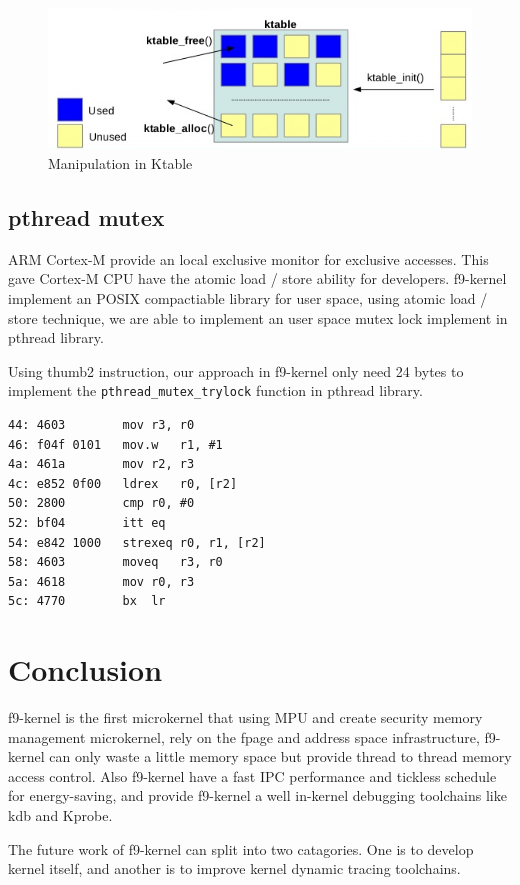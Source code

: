 \documentclass[10pt,preprint,nocopyrightspace]{sigplanconf}
\begin{document}
\begin{figure}[H]
	\begin{center}
		\includegraphics[width=\linewidth]{picture/ktable.png}
	\end{center}
	\caption{Manipulation in Ktable\cite{ncku2015}}
\end{figure}

\subsection{pthread mutex}
ARM Cortex-M provide an local exclusive monitor for exclusive accesses. This gave Cortex-M CPU have the atomic load / store ability for developers\cite{arm2012v7}. f9-kernel implement an POSIX compactiable library for user space, using atomic load / store technique, we are able to implement an user space mutex lock implement in pthread library.

Using thumb2 instruction, our approach in f9-kernel only need 24 bytes to implement the \texttt{pthread\_mutex\_trylock} function in pthread library.

\begin{lstlisting}[basicstyle=\small,frame=single]
44:	4603      	mov	r3, r0
46:	f04f 0101 	mov.w	r1, #1
4a:	461a      	mov	r2, r3
4c:	e852 0f00 	ldrex	r0, [r2]
50:	2800      	cmp	r0, #0
52:	bf04      	itt	eq
54:	e842 1000 	strexeq	r0, r1, [r2]
58:	4603      	moveq	r3, r0
5a:	4618      	mov	r0, r3
5c:	4770      	bx	lr
\end{lstlisting}

\section{Conclusion}
f9-kernel is the first microkernel that using MPU and create security memory management microkernel, rely on the fpage and address space infrastructure, f9-kernel can only waste a little memory space but provide thread to thread memory access control. Also f9-kernel have a fast IPC performance and tickless schedule for energy-saving, and provide f9-kernel a well in-kernel debugging toolchains like kdb and Kprobe.

The future work of f9-kernel can split into two catagories. One is to develop kernel itself, and another is to improve kernel dynamic tracing toolchains.


\end{document}
